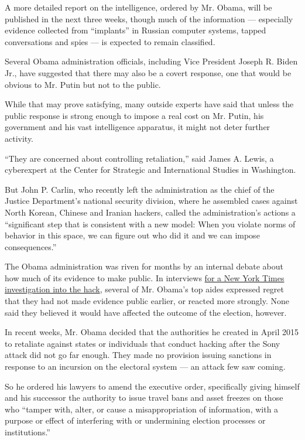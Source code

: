 A more detailed report on the intelligence, ordered by Mr. Obama, will
be published in the next three weeks, though much of the information ---
especially evidence collected from ``implants'' in Russian computer
systems, tapped conversations and spies --- is expected to remain
classified.

Several Obama administration officials, including Vice President Joseph
R. Biden Jr., have suggested that there may also be a covert response,
one that would be obvious to Mr. Putin but not to the public.

While that may prove satisfying, many outside experts have said that
unless the public response is strong enough to impose a real cost on Mr.
Putin, his government and his vast intelligence apparatus, it might not
deter further activity.

``They are concerned about controlling retaliation,'' said James A.
Lewis, a cyberexpert at the Center for Strategic and International
Studies in Washington.

But John P. Carlin, who recently left the administration as the chief of
the Justice Department's national security division, where he assembled
cases against North Korean, Chinese and Iranian hackers, called the
administration's actions a ``significant step that is consistent with a
new model: When you violate norms of behavior in this space, we can
figure out who did it and we can impose consequences.''

The Obama administration was riven for months by an internal debate
about how much of its evidence to make public. In interviews
\href{https://www.nytimes3xbfgragh.onion/2016/12/13/us/politics/russia-hack-election-dnc.html?hp\&action=click\&pgtype=Homepage\&clickSource=story-heading\&module=b-lede-package-region\&region=top-news\&WT.nav=top-news\&_r=0,}{for
a New York Times investigation into the hack}, several of Mr. Obama's
top aides expressed regret that they had not made evidence public
earlier, or reacted more strongly. None said they believed it would have
affected the outcome of the election, however.

In recent weeks, Mr. Obama decided that the authorities he created in
April 2015 to retaliate against states or individuals that conduct
hacking after the Sony attack did not go far enough. They made no
provision issuing sanctions in response to an incursion on the electoral
system --- an attack few saw coming.

So he ordered his lawyers to amend the executive order, specifically
giving himself and his successor the authority to issue travel bans and
asset freezes on those who ``tamper with, alter, or cause a
misappropriation of information, with a purpose or effect of interfering
with or undermining election processes or institutions.''

